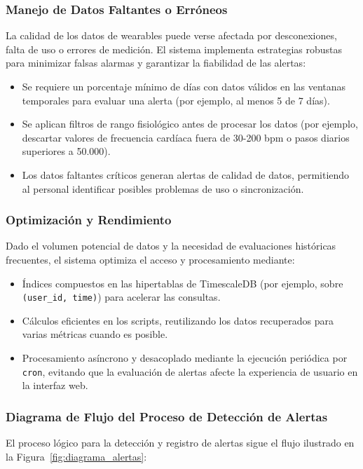 \subsubsection*{Manejo de Datos Faltantes o Erróneos}
La calidad de los datos de wearables puede verse afectada por desconexiones, falta de uso o errores de medición. El sistema implementa estrategias robustas para minimizar falsas alarmas y garantizar la fiabilidad de las alertas:
\begin{itemize}
    \item Se requiere un porcentaje mínimo de días con datos válidos en las ventanas temporales para evaluar una alerta (por ejemplo, al menos 5 de 7 días).
    \item Se aplican filtros de rango fisiológico antes de procesar los datos (por ejemplo, descartar valores de frecuencia cardíaca fuera de 30-200 bpm o pasos diarios superiores a 50.000).
    \item Los datos faltantes críticos generan alertas de calidad de datos, permitiendo al personal identificar posibles problemas de uso o sincronización.
\end{itemize}

\subsubsection*{Optimización y Rendimiento}
Dado el volumen potencial de datos y la necesidad de evaluaciones históricas frecuentes, el sistema optimiza el acceso y procesamiento mediante:
\begin{itemize}
    \item Índices compuestos en las hipertablas de TimescaleDB (por ejemplo, sobre \texttt{(user\_id, time)}) para acelerar las consultas.
    \item Cálculos eficientes en los scripts, reutilizando los datos recuperados para varias métricas cuando es posible.
    \item Procesamiento asíncrono y desacoplado mediante la ejecución periódica por \texttt{cron}, evitando que la evaluación de alertas afecte la experiencia de usuario en la interfaz web.
\end{itemize}

\subsubsection*{Diagrama de Flujo del Proceso de Detección de Alertas}
El proceso lógico para la detección y registro de alertas sigue el flujo ilustrado en la Figura~\ref{fig:diagrama_alertas}:


